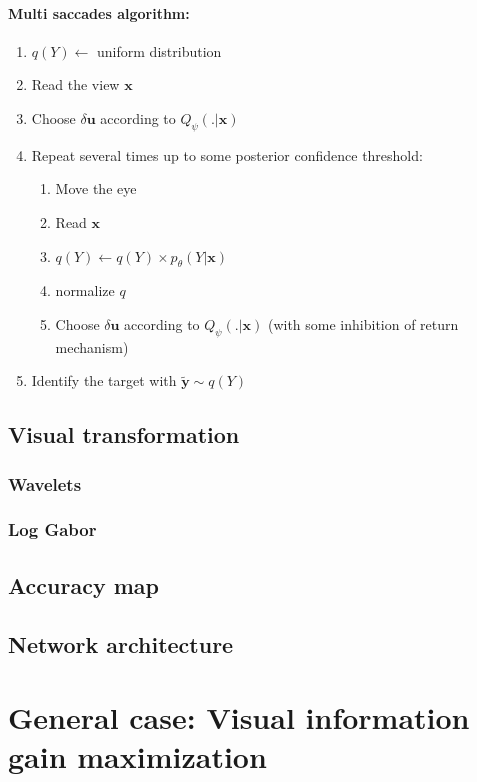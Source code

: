\paragraph{Multi saccades algorithm:}
\begin{enumerate}
\item $q(Y) \leftarrow$ uniform distribution
\item Read the view $\boldsymbol{x}$
\item Choose $\delta\boldsymbol{u}$ according to $Q_\psi(.|\boldsymbol{x})$
\item Repeat several times up to some posterior confidence threshold:
	\begin{enumerate}
		\item Move the eye
		\item Read $\boldsymbol{x}$
		\item $q(Y) \leftarrow q(Y) \times p_\theta(Y|\boldsymbol{x})$
		\item normalize $q$
		\item Choose $\delta\boldsymbol{u}$ according to $Q_\psi(.|\boldsymbol{x})$ (with some inhibition of return mechanism)
	\end{enumerate}
	\item Identify the target with $\tilde{\boldsymbol{y}} \sim q(Y)$
\end{enumerate}

\subsection{Visual transformation}
\subsubsection{Wavelets}
\subsubsection{Log Gabor}

\subsection{Accuracy map}

\subsection{Network architecture}
\fi


\section{General case: Visual information gain maximization}\label{sec:case1}

